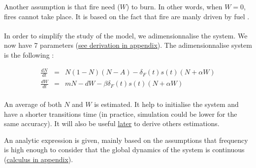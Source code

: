 \documentclass{article}
\begin{document}
Another assumption is that fire need ($W$) to burn. In other words, when $W=0$, fires cannot take place. It is based on the fact that fire are manly driven by fuel \citep{schoennagel_interaction_2004, stephens_effects_2012, syphard_comparing_2011, safford_effects_2009, stephens_experimental_2005}.




\paragraph{}
In order to simplify the study of the model, we adimensionnalise the system. We now have 7 parameters (\hyperref[adim]{see derivation in appendix}). The adimensionnalise system is the following :



\begin{eqnarray}
\frac{dN}{dt} & = & N(1-N)(N-A) - \delta_F(t)s(t)(N+\alpha W) \\
\frac{dW}{dt} & = & mN -dW - \beta\delta_F(t)s(t)(N+\alpha W) 
\end{eqnarray}









\paragraph{}
\label{average_estimation}
An average of both $N$ and $W$ is estimated. It help to initialise the system and have a shorter transitions time (in practice, simulation could be lower for the same accuracy). It will also be useful \hyperref[estimation]{later} to derive others estimations.

An analytic expression is given, mainly based on the assumptions that frequency is high enough to consider that the global dynamics of the system is continuous (\hyperref[average]{calculus in appendix}).
\end{document}
